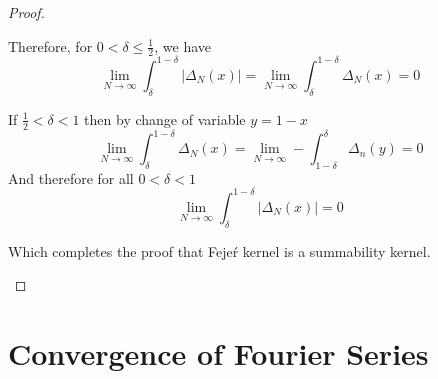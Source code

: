 \begin{proof}
\begin{enumerate}
        Therefore, for $0 < \delta \le \frac{1}{2}$, we have 
        \begin{displaymath}
          \lim_{N \to \infty} \int_\delta^{1-\delta} \left|\Delta_N(x)\right| = \lim_{N \to \infty} \int_\delta^{1-\delta} \Delta_N(x) = 0
        \end{displaymath}

        If $\frac{1}{2} < \delta < 1$ then by change of variable $y = 1 - x$
        \begin{displaymath}
          \lim_{N\to \infty} \int_\delta^{1-\delta} \Delta_N(x) = \lim_{N \to \infty} - \int_{1-\delta}^{\delta} \Delta_n(y) = 0
        \end{displaymath}
        And therefore for all $0 < \delta < 1$ 
        \begin{displaymath}
          \lim_{N \to \infty} \int_\delta^{1-\delta} \left|\Delta_N(x)\right| =  0
        \end{displaymath}


      Which completes the proof that  Feje\'r kernel is a summability kernel.
    \end{enumerate}
  \end{proof}


  \section{Convergence of Fourier Series} %
  \label{ssub:Convergence of Fourier Series}


